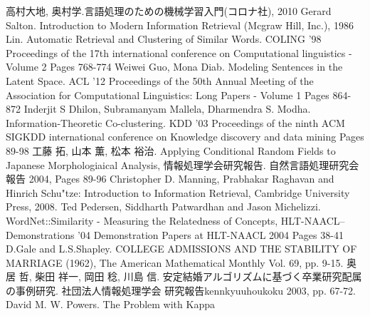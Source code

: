 \documentclass[12pt]{jarticle}
\begin{document}
\newpage
\pagestyle{empty}
\begin{thebibliography}{9}
   高村大地, 奥村学.言語処理のための機械学習入門(コロナ社), 2010
   Gerard Salton. Introduction to Modern Information Retrieval (Mcgraw Hill, Inc.), 1986
   Lin. Automatic Retrieval and Clustering of Similar Words. COLING '98 Proceedings of the 17th international conference on Computational linguistics - Volume 2 Pages 768-774
   Weiwei Guo, Mona Diab. Modeling Sentences in the Latent Space. ACL '12 Proceedings of the 50th Annual Meeting of the Association for Computational Linguistics: Long Papers - Volume 1
Pages 864-872
   Inderjit S Dhilon, Subramanyam Mallela, Dharmendra S. Modha. Information-Theoretic Co-clustering. KDD '03 Proceedings of the ninth ACM SIGKDD international conference on Knowledge discovery and data mining
Pages 89-98
  工藤 拓, 山本 薫, 松本 裕治. Applying Conditional Random Fields to Japanese Morphologiaical Analysis, 情報処理学会研究報告. 自然言語処理研究会報告 2004, Pages 89-96
  Christopher D. Manning, Prabhakar Raghavan and Hinrich Schu"tze: Introduction to Information Retrieval, Cambridge University Press, 2008.
 Ted Pedersen, Siddharth Patwardhan and Jason Michelizzi. WordNet::Similarity - Measuring the Relatedness of Concepts, HLT-NAACL--Demonstrations '04 Demonstration Papers at HLT-NAACL 2004 Pages 38-41
  D.Gale and L.S.Shapley. COLLEGE ADMISSIONS AND THE STABILITY OF MARRIAGE (1962), The American Mathematical Monthly Vol. 69, pp. 9-15.
  奥居 哲, 柴田 祥一, 岡田 稔, 川島 信. 安定結婚アルゴリズムに基づく卒業研究配属の事例研究. 社団法人情報処理学会 研究報告kennkyuuhoukoku 2003, pp. 67-72.
  David M. W. Powers. The Problem with Kappa
\end{thebibliography}
\end{document}
